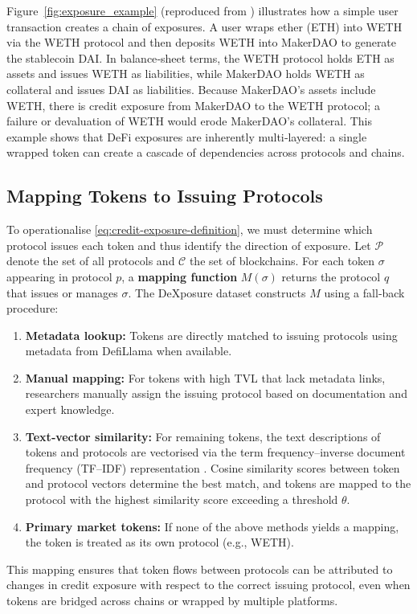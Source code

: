Figure~\ref{fig:exposure_example} (reproduced from \cite{wu2025}) illustrates how a simple user transaction creates a chain of exposures.  A user wraps ether (ETH) into WETH via the WETH protocol and then deposits WETH into MakerDAO to generate the stablecoin DAI.  In balance‑sheet terms, the WETH protocol holds ETH as assets and issues WETH as liabilities, while MakerDAO holds WETH as collateral and issues DAI as liabilities.  Because MakerDAO’s assets include WETH, there is credit exposure from MakerDAO to the WETH protocol; a failure or devaluation of WETH would erode MakerDAO’s collateral.  This example shows that DeFi exposures are inherently multi‑layered: a single wrapped token can create a cascade of dependencies across protocols and chains.

\subsection{Mapping Tokens to Issuing Protocols}

To operationalise \eqref{eq:credit-exposure-definition}, we must determine which protocol issues each token and thus identify the direction of exposure.  Let $\mathcal{P}$ denote the set of all protocols and $\mathcal{C}$ the set of blockchains.  For each token $\sigma$ appearing in protocol $p$, a \textbf{mapping function} $M(\sigma)$ returns the protocol $q$ that issues or manages $\sigma$.  The DeXposure dataset constructs $M$ using a fall‑back procedure:
\begin{enumerate}
  \item \textbf{Metadata lookup:} Tokens are directly matched to issuing protocols using metadata from DefiLlama when available.
  \item \textbf{Manual mapping:} For tokens with high TVL that lack metadata links, researchers manually assign the issuing protocol based on documentation and expert knowledge.
  \item \textbf{Text‑vector similarity:} For remaining tokens, the text descriptions of tokens and protocols are vectorised via the term frequency–inverse document frequency (TF--IDF) representation \cite{Qaiser2018}.  Cosine similarity scores between token and protocol vectors determine the best match, and tokens are mapped to the protocol with the highest similarity score exceeding a threshold $\theta$.
  \item \textbf{Primary market tokens:} If none of the above methods yields a mapping, the token is treated as its own protocol (e.g., WETH).
\end{enumerate}
This mapping ensures that token flows between protocols can be attributed to changes in credit exposure with respect to the correct issuing protocol, even when tokens are bridged across chains or wrapped by multiple platforms.


